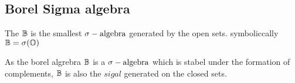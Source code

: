 \subsection{Borel Sigma algebra} %
\label{sub:borel_sigma_algebra}
\begin{defn}
  The   \({\mathbb{B}}\) is the smallest \(\sigma-\text{algebra}\) generated by the open sets. symboliccally \({\mathbb{B}}=\sigma({\mathbb{O}})\)
\end{defn}
\begin{rem}
  As the borel algrebra \({\mathbb{B}}\) is a \(\sigma-\text{algebra}\) which is stabel under the formation of complements, \({\mathbb{B}}\) is also the \(sigal\) generated on the closed sets.
\end{rem}
